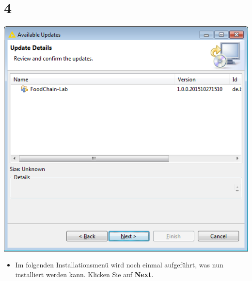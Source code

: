 \documentclass{beamer}
\begin{document}
\section{4}
\begin{frame}
	\begin{center}
  		\includegraphics[height=0.6\textheight]{4.png}
	\end{center}
	\begin{itemize}
		\item Im folgenden Installationsmenü wird noch einmal aufgeführt, was nun installiert werden kann. Klicken Sie auf \textbf{Next}.
	\end{itemize}
\end{frame}
\end{document}
